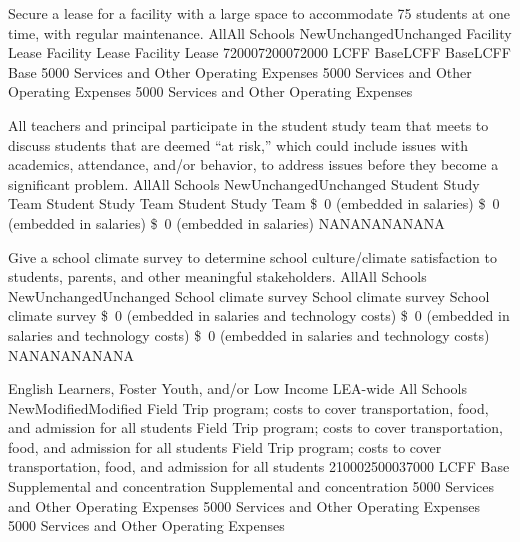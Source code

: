 \documentclass{article}
\newcommand{\dollar}[1]{\SI{#1}[\$]{}}
\newcounter{goal}[section] %
\newcounter{action}[goal]
\begin{document}
\begin{planactions}
	\planaction
	{Secure a lease for a facility with a large space to accommodate 75 students at one time, with regular maintenance.}
	\planaction@scope
	{All}{All Schools}
	\planaction@action
	{New}{Unchanged}{Unchanged}
	{Facility Lease}
	{Facility Lease}
	{Facility Lease}
	\planaction@budget
	{72000}{72000}{72000}
	{LCFF Base}{LCFF Base}{LCFF Base}
	{\num{5000} Services and Other Operating Expenses}
	{\num{5000} Services and Other Operating Expenses}
	{\num{5000} Services and Other Operating Expenses}

	\planaction
	{All teachers and principal participate in the student study team that meets to discuss students that are deemed ``at risk,'' which could include issues with academics, attendance, and/or behavior, to address issues before they become a significant problem.}
	\planaction@scope
	{All}{All Schools}
	\planaction@action
	{New}{Unchanged}{Unchanged}
	{Student Study Team}
	{Student Study Team}
	{Student Study Team}
	\planaction@budget
	{\dollar{0} (embedded in salaries)}
	{\dollar{0} (embedded in salaries)}
	{\dollar{0} (embedded in salaries)}
	{NA}{NA}{NA}{NA}{NA}{NA}

	\planaction
	{Give a school climate survey to determine school culture/climate satisfaction to students, parents, and other meaningful stakeholders.}
	\planaction@scope
	{All}{All Schools}
	\planaction@action
	{New}{Unchanged}{Unchanged}
	{School climate survey}
	{School climate survey}
	{School climate survey}
	\planaction@budget
	{\dollar{0} (embedded in salaries and technology costs)}
	{\dollar{0} (embedded in salaries and technology costs)}
	{\dollar{0} (embedded in salaries and technology costs)}
	{NA}{NA}{NA}{NA}{NA}{NA}
	
	\planaction@scope
	{English Learners, Foster Youth, and/or Low Income}
	{LEA-wide}
	{All Schools}
	\planaction@action
	{New}{Modified}{Modified}
	{Field Trip program; costs to cover transportation, food, and admission for all students}
	{Field Trip program; costs to cover transportation, food, and admission for all students}
	{Field Trip program; costs to cover transportation, food, and admission for all students}
	\planaction@budget
	{21000}{25000}{37000}
	{LCFF Base}
	{Supplemental and concentration}
	{Supplemental and concentration}
	{\num{5000} Services and Other Operating Expenses} 
	{\num{5000} Services and Other Operating Expenses} 
	{\num{5000} Services and Other Operating Expenses} 
\end{planactions}
\end{document}

